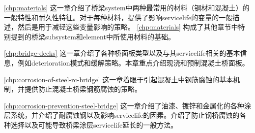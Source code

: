 \cref{chp:materials}  这一章介绍了桥梁\gls{system}中两种最常用的材料（钢材和混凝土）的一般特性和耐久性特征。对于每种材料，提供了影响\gls{servicelife}的变量的一般描述，然后是用于减轻这些变量影响的策略。 \cref{chp:materials} 构成了其他章节中特别提到的桥梁\gls{subsystem}和\gls{element}中所使用材料的基础。

\cref{chp:bridge-decks}  这一章介绍了各种桥面板类型以及与其\gls{servicelife}相关的基本信息，例如\gls*{deterioration}模式和缓解策略。本章重点介绍现浇和预制混凝土桥面板。

\cref{chp:corrosion-of-steel-rc-bridge}  这一章着眼于引起混凝土中钢筋腐蚀的基本机制，并提供防止混凝土桥梁钢筋腐蚀的策略。

\cref{chp:corrosion-prevention-steel-bridge}  这一章介绍了油漆、镀锌和金属化的各种涂层系统，并介绍了耐腐蚀钢以及影响\gls{servicelife}的因素。介绍了防止钢桥腐蚀的各种选择以及可能导致桥梁涂层\gls{servicelife}延长的一般方法。

